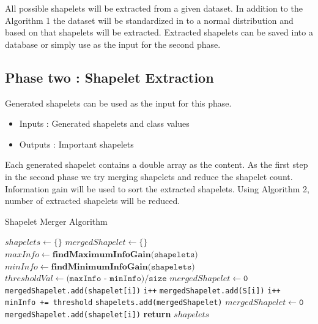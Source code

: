 \documentclass[letterpaper, 10 pt, conference]{IEEEtran}  %
\begin{document}
All possible shapelets will be extracted from a given dataset. In addition to the Algorithm 1 the dataset will be standardized in to a normal distribution and based on that shapelets will be extracted. Extracted shapelets can be saved into a database or simply use as the input for the second phase. 

\subsection{Phase two : Shapelet Extraction}
Generated shapelets can be used as the input for this phase.
\begin{itemize}
\item Inputs : Generated shapelets and class values
\item Outputs : Important shapelets
\end{itemize}

Each generated shapelet contains a double array as the content. As the first step in the second phase we try merging shapelets and reduce the shapelet count. Information gain will be used to sort the extracted shapelets. Using Algorithm 2, number of extracted shapelets will be reduced. 

\begin{algorithm}[H]
  \caption{Shapelet Merger Algorithm}\label{shapeletMerger}
  \begin{algorithmic}[1]
     \State $shapelets \gets \{\}$
     \State $mergedShapelet \gets \{\}$
      \State $maxInfo \gets \textbf{findMaximumInfoGain(} \texttt{shapelets} \textbf{)}$
      \State $minInfo \gets \textbf{findMinimumInfoGain(} \texttt{shapelets} \textbf{)}$
      \State $thresholdVal \gets \texttt{(maxInfo - minInfo)/size}$
      \State $mergedShapelet \gets \texttt{0}$
      \State \texttt{mergedShapelet.add(shapelet[i])}
      \State \texttt{i++}
      \State \texttt{mergedShapelet.add(S[i])}
      \State \texttt{i++}
      \EndIf
        \State \texttt{minInfo += threshold}
        \State \texttt{shapelets.add(mergedShapelet)}
        \State $mergedShapelet \gets \texttt{0}$
       \State \texttt{mergedShapelet.add(shapelet[i])}
        \EndIf
      \EndWhile
      \State \textbf{return} $shapelets$
    \EndProcedure
  \end{algorithmic}
\end{algorithm}
\end{document}
